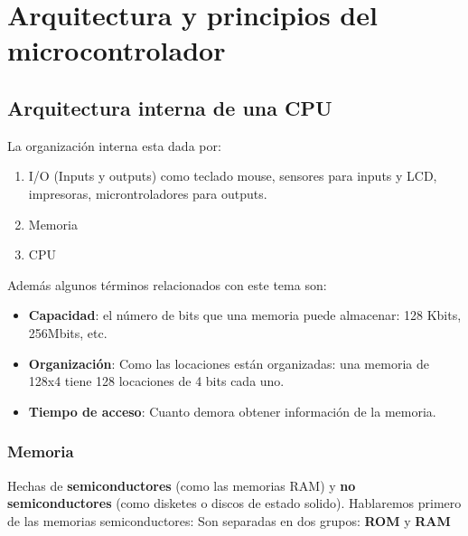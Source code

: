 \documentclass[
	12pt, %
	fleqn, %
	a4paper, %
	oneside, %
]{LegrandOrangeBook}
\begin{document}
\chapter{Arquitectura y principios del microcontrolador}
\section{Arquitectura interna de una CPU}
La organización interna esta dada por:
\begin{enumerate}
\item I/O (Inputs y outputs) como teclado mouse, sensores para inputs y LCD, impresoras, microntroladores para outputs.
\item Memoria
\item CPU
\end{enumerate}
Además algunos términos relacionados con este tema son:
\begin{itemize}
\item \textbf{Capacidad}: el número de bits que una memoria puede almacenar: 128 Kbits, 256Mbits, etc.
\item \textbf{Organización}: Como las locaciones están organizadas: una memoria de 128x4 tiene 128 locaciones de 4 bits cada uno.
\item \textbf{Tiempo de acceso}: Cuanto demora obtener información de la memoria.
\end{itemize}
\subsection{Memoria}
Hechas de \textbf{semiconductores} (como las memorias RAM) y \textbf{no semiconductores} (como disketes o discos de estado solido). Hablaremos primero de las memorias semiconductores: Son separadas en dos grupos: \textbf{ROM} y \textbf{RAM}
\end{document}

